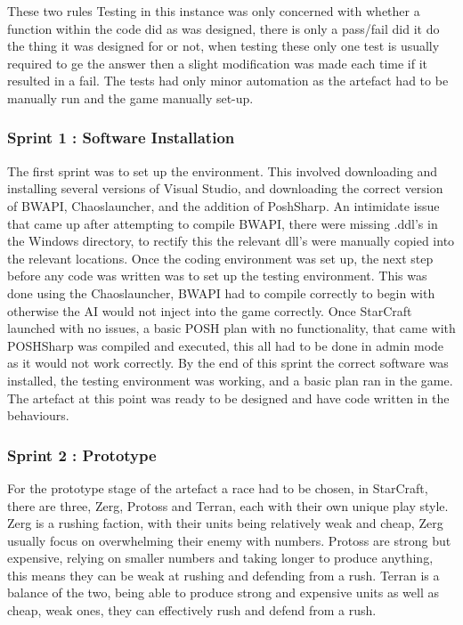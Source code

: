 \documentclass[journal]{IEEEtran}
\begin{document}
These two rules 
Testing in this instance was only concerned with whether a function within the code did as was designed, there is only a pass/fail did it do the thing it was designed for or not, when testing these only one test is usually required to ge the answer then a slight modification was made each time if it resulted in a fail. The tests had only minor automation as the artefact had to be manually run and the game manually set-up.
\newline

\subsubsection{Sprint 1 : Software Installation}
The first sprint was to set up the environment. This involved downloading and installing several versions of Visual Studio, and downloading the correct version of BWAPI, Chaoslauncher, and the addition of PoshSharp. An intimidate issue that came up after attempting to compile BWAPI, there were missing .ddl's in the Windows directory, to rectify this the relevant dll's were manually copied into the relevant locations. Once the coding environment was set up, the next step before any code was written was to set up the testing environment. This was done using the Chaoslauncher, BWAPI had to compile correctly to begin with otherwise the AI would not inject into the game correctly. Once StarCraft launched with no issues, a basic POSH plan with no functionality, that came with POSHSharp was compiled and executed, this all had to be done in admin mode as it would not work correctly. By the end of this sprint the correct software was installed, the testing environment was working, and a basic plan ran in the game. The artefact at this point was ready to be designed and have code written in the behaviours.
\newline

\subsubsection{Sprint 2 : Prototype}
For the prototype stage of the artefact a race had to be chosen, in StarCraft, there are three, Zerg, Protoss and Terran, each with their own unique play style. Zerg is a rushing faction, with their units being relatively weak and cheap, Zerg usually focus on overwhelming their enemy with numbers. Protoss are strong but expensive, relying on smaller numbers and taking longer to produce anything, this means they can be weak at rushing and defending from a rush. Terran is a balance of the two, being able to produce strong and expensive units as well as cheap, weak ones, they can effectively rush and defend from a rush.
\end{document}
